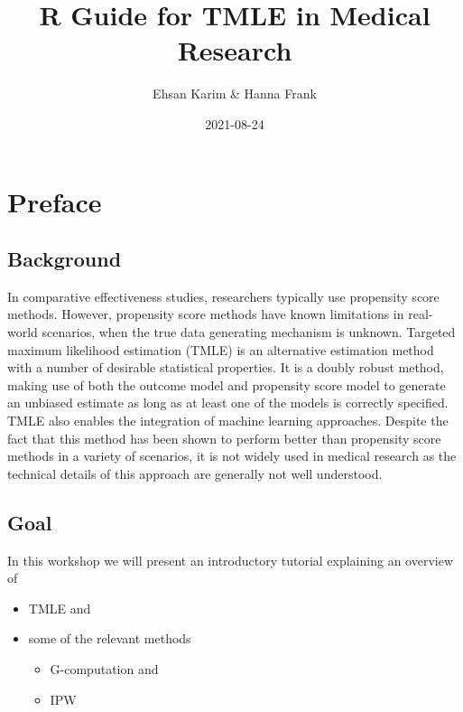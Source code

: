 \documentclass[
]{book}
\title{R Guide for TMLE in Medical Research}
\author{Ehsan Karim \& Hanna Frank}
\date{2021-08-24}
\providecommand{\tightlist}{%
  \setlength{\itemsep}{0pt}\setlength{\parskip}{0pt}}
\begin{document}
\maketitle

{
\setcounter{tocdepth}{1}
\tableofcontents
}
\newenvironment{blackbox}{
  \definecolor{shadecolor}{rgb}{0, 0, 0}  %
  \color{white}
  \begin{shaded}}
 {\end{shaded}}

\hypertarget{preface}{%
\chapter*{Preface}\label{preface}}

\hypertarget{background}{%
\section*{Background}\label{background}}

In comparative effectiveness studies, researchers typically use propensity score methods. However, propensity score methods have known limitations in real-world scenarios, when the true data generating mechanism is unknown. Targeted maximum likelihood estimation (TMLE) is an alternative estimation method with a number of desirable statistical properties. It is a doubly robust method, making use of both the outcome model and propensity score model to generate an unbiased estimate as long as at least one of the models is correctly specified. TMLE also enables the integration of machine learning approaches. Despite the fact that this method has been shown to perform better than propensity score methods in a variety of scenarios, it is not widely used in medical research as the technical details of this approach are generally not well understood.

\hypertarget{goal}{%
\section*{Goal}\label{goal}}

In this workshop we will present an introductory tutorial explaining an overview of

\begin{itemize}
\tightlist
\item
  TMLE and
\item
  some of the relevant methods

  \begin{itemize}
  \tightlist
  \item
    G-computation and
  \item
    IPW
  \end{itemize}
\end{itemize}
\end{document}
